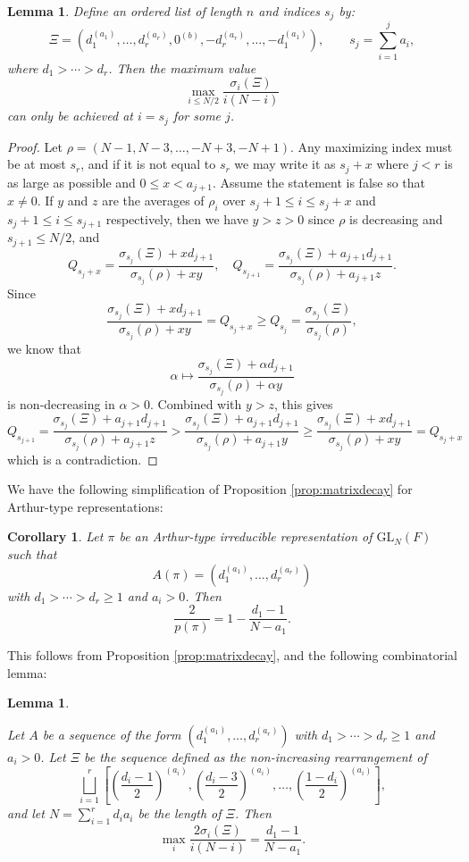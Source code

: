 \documentclass{amsart}
\newcommand{\lf}{\left}
\newcommand{\ri}{\right}
\newcommand{\f}{\frac}
\newcommand{\GL}{\mathrm{GL}}
\newcommand{\1}{\m 1}
\newtheorem{cor}[thm]{Corollary}
\newtheorem{lem}[thm]{Lemma}
\theoremstyle{remark}
\theoremstyle{definition}
\numberwithin{equation}{subsection}
\begin{document}
\begin{lem}\label{lem:indexofmaximum1}
Define an ordered list of length $n$ and indices $s_j$ by:
\[
\Xi = (d_1^{(a_1)}, \dotsc, d_r^{(a_r)}, 0^{(b)}, -d_r^{(a_r)}, \dotsc, -d_1^{(a_1)}), 
\qquad s_j = \sum_{i=1}^j a_i,
\]
where $d_1 > \cdots > d_r$. Then the maximum value 
\[ 
\max_{i \le N/2} \f{\sigma_i(\Xi)}{i(N-i)} 
\] 
can only be achieved at $i=s_j$ for some $j$.
\end{lem}

\begin{proof}
Let $\rho = (N-1, N-3, \dotsc, -N+3, -N + 1)$.  Any maximizing index must be at most $s_r$, and if it is not equal to $s_r$ we may write it as $s_j + x$ where $j < r$ is as large as possible and $0 \leq x < a_{j+1}$. Assume the statement is false so that $x \neq 0$. If $y$ and $z$ are the averages of $\rho_i$ over $s_j + 1 \le i \le s_j + x$ and $s_j + 1 \le i \le s_{j+1}$ respectively, then we have $y > z > 0$ since $\rho$ is decreasing and $s_{j+1} \le N/2$, and
\[
Q_{s_j + x} = \f{\sigma_{s_j}(\Xi) + x d_{j+1}}{\sigma_{s_j}(\rho) + xy}, \quad Q_{s_{j+1}} = \f{\sigma_{s_j}(\Xi) + a_{j+1} d_{j+1}}{\sigma_{s_j}(\rho) + a_{j+1} z}.
\]
Since
\[
\f{\sigma_{s_j}(\Xi) + x d_{j+1}}{\sigma_{s_j}(\rho) + xy} = Q_{s_j + x} \geq Q_{s_j} = \f{\sigma_{s_j}(\Xi)}{\sigma_{s_j}(\rho)}, 
\]
we know that 
\[
\alpha \mapsto \f{\sigma_{s_j}(\Xi) + \alpha d_{j+1}}{\sigma_{s_j}(\rho) + \alpha y}
\]
is non-decreasing in $\alpha > 0$. Combined with $y > z$, this gives
\[
Q_{s_{j+1}} = \f{\sigma_{s_j}(\Xi) + a_{j+1} d_{j+1}}{\sigma_{s_j}(\rho) + a_{j+1} z} > \f{\sigma_{s_j}(\Xi) + a_{j+1} d_{j+1}}{\sigma_{s_j}(\rho) + a_{j+1} y} \geq \f{\sigma_{s_j}(\Xi) + x d_{j+1}}{\sigma_{s_j}(\rho) + x y} = Q_{s_j + x}
\]
which is a contradiction. 
\end{proof}

We have the following simplification of Proposition \ref{prop:matrixdecay} for Arthur-type representations:

\begin{cor}\label{cor:mcdecaysimple}
Let $\pi$ be an Arthur-type irreducible representation of $\GL_N(F)$ such that 
\[
A(\pi) = (d_1^{(a_1)}, \dotsc, d_r^{(a_r)})
\]
with $d_1 > \cdots > d_r \geq 1$ and $a_i > 0$. Then
\[
\f2{p(\pi)} = 1 - \f{d_1 - 1}{N - a_1}. 
\]
\end{cor}

This follows from Proposition \ref{prop:matrixdecay}, and the following combinatorial lemma:

\begin{lem}\label{lem:indexofmaximum2}

Let $A$ be a sequence of the form $(d_1^{(a_1)}, \dotsc, d_r^{(a_r)})$ with $d_1 > \cdots > d_r \geq 1$ and $a_i > 0$.  Let $\Xi$ be the sequence defined as the non-increasing rearrangement of
\[
\bigsqcup_{i=1}^r \lf[ \left( \f{d_i-1}2 \right)^{(a_i)}, \left( \f{d_i-3}2 \right)^{(a_i)}, \dotsc, \left( \f{1-d_i}2 \right)^{(a_i)} \ri],
\]
and let $N = \sum_{i=1}^r d_i a_i$ be the length of $\Xi$.  Then
\[
\max_i \f{2\sigma_i(\Xi)}{i(N-i)} = \frac{d_1 - 1}{N - a_1}.
\]

\end{lem}
\end{document}
